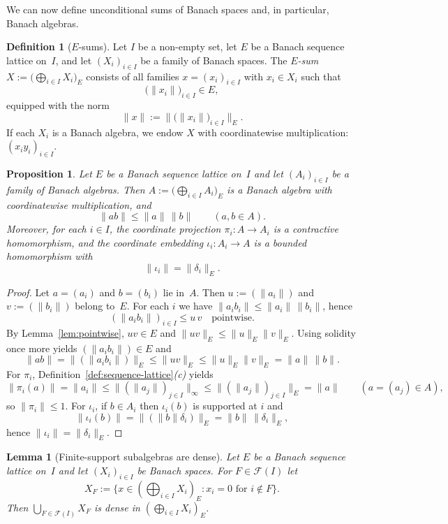 \documentclass[reqno]{amsart}
\theoremstyle{plain}
\newtheorem{lemma}[theorem]{Lemma}
\newtheorem{proposition}[theorem]{Proposition}
\theoremstyle{definition}
\newtheorem{definition}[theorem]{Definition}
\theoremstyle{remark}
\newcommand{\cF}{\mathcal{F}}
\renewcommand{\le}{\leqslant}
\begin{document}
We can now define unconditional sums of Banach spaces and, in particular, Banach algebras.

\begin{definition}[$E$-sums]\label{def:Esum}
Let $I$ be a non-empty set, let $E$ be a Banach sequence lattice on~$I$, and let $(X_i)_{i\in I}$ be a family of Banach spaces.
The \emph{$E$-sum} $X:=\big(\bigoplus_{i\in I}X_i\big)_{\!E}$ consists of all families $x=(x_i)_{i\in I}$ with $x_i\in X_i$ such that
\[
\bigl(\|x_i\|\bigr)_{i\in I}\in E,
\]
equipped with the norm
\[
\|x\|:=\bigl\|\bigl(\|x_i\|\bigr)_{i\in I}\bigr\|_E.
\]
If each $X_i$ is a Banach algebra, we endow $X$ with coordinatewise multiplication:
$(x_iy_i)_{i\in I}$.
\end{definition}

\begin{proposition}\label{prop:Esum-algebra}
Let $E$ be a Banach sequence lattice on~$I$ and let $(A_i)_{i\in I}$ be a family of Banach algebras.
Then $A:=\big(\bigoplus_{i\in I}A_i\big)_{\!E}$ is a Banach algebra with coordinatewise multiplication, and
\[
\|ab\|\le \|a\|\,\|b\| \qquad (a,b\in A).
\]
Moreover, for each $i\in I$, the coordinate projection $\pi_i\colon A\to A_i$ is a contractive homomorphism,
and the coordinate embedding $\iota_i\colon A_i\to A$ is a bounded homomorphism with
\[
\|\iota_i\|=\|\delta_i\|_E.
\]
\end{proposition}

\begin{proof}
Let $a=(a_i)$ and $b=(b_i)$ lie in~$A$.
Then $u:=(\|a_i\|)$ and $v:=(\|b_i\|)$ belong to~$E$.
For each $i$ we have $\|a_ib_i\|\le \|a_i\|\,\|b_i\|$, hence
\[
(\|a_ib_i\|)_{i\in I}\le u\,v \quad\text{pointwise}.
\]
By Lemma~\ref{lem:pointwise}, $uv\in E$ and $\|uv\|_E\le \|u\|_E\|v\|_E$.
Using solidity once more yields $(\|a_ib_i\|)\in E$ and
\[
\|ab\|=\|(\|a_ib_i\|)\|_E\le \|uv\|_E\le \|u\|_E\|v\|_E=\|a\|\,\|b\|.
\]
For $\pi_i$, Definition~\ref{def:sequence-lattice}\emph{(c)} yields
\[
\|\pi_i(a)\|=\|a_i\|
\le \bigl\|(\|a_j\|)_{j\in I}\bigr\|_{\infty}
\le \bigl\|(\|a_j\|)_{j\in I}\bigr\|_{E}
=\|a\|
\qquad (a=(a_j)\in A),
\]
so $\|\pi_i\|\le 1$.
For $\iota_i$, if $b\in A_i$ then $\iota_i(b)$ is supported at $i$ and
\[
\|\iota_i(b)\|
= \bigl\|(\|b\|\delta_i)\bigr\|_{E}
= \|b\|\,\|\delta_i\|_{E},
\]
hence $\|\iota_i\|=\|\delta_i\|_{E}$.
\end{proof}

\begin{lemma}[Finite-support subalgebras are dense]\label{lem:dense-finite-support}
Let $E$ be a Banach sequence lattice on~$I$ and let $(X_i)_{i\in I}$ be Banach spaces.
For $F\in\cF(I)$ let
\[
X_F:=\{x\in (\bigoplus_{i\in I}X_i)_E : x_i=0 \text{ for } i\notin F\}.
\]
Then $\bigcup_{F\in\cF(I)}X_F$ is dense in $(\bigoplus_{i\in I}X_i)_E$.
\end{lemma}
\end{document}
